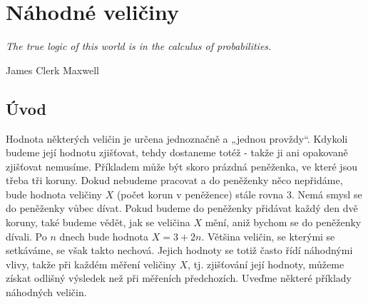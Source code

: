 \graphicspath{{../src/MAI/img/}}
\setchaptertoc
\chapter{Náhodné veličiny}\label{mai:IchapIVb}
  \epigraph{\emph{The true logic of this world is in the calculus of probabilities.}}{James Clerk 
    Maxwell}
  \section{Úvod}\label{mai:IchapIVsecIII}
    Hodnota některých veličin je určena jednoznačně a „jednou provždy“. Kdykoli budeme její hodnotu 
    zjišťovat, tehdy dostaneme totéž - takže ji ani opakovaně zjišťovat nemusíme. Příkladem může 
    být skoro prázdná peněženka, ve které jsou třeba tři koruny. Dokud nebudeme pracovat a do 
    peněženky něco nepřidáme, bude hodnota veličiny \(X\) (počet korun v peněžence) stále rovna 
    \num{3}. Nemá smysl se do peněženky vůbec dívat. Pokud budeme do peněženky přidávat každý den 
    dvě koruny, také budeme vědět, jak se veličina \(X\) mění, aniž bychom se do peněženky dívali. 
    Po \(n\) dnech bude hodnota \(X = 3 + 2n\). Většina veličin, se kterými se setkáváme, se však 
    takto nechová. Jejich hodnoty se totiž často řídí náhodnými vlivy, takže při každém
    měření veličiny \(X\), tj. zjišťování její hodnoty, můžeme získat odlišný výsledek než při 
    měřeních předchozích. Uveďme některé příklady náhodných veličin.
    
